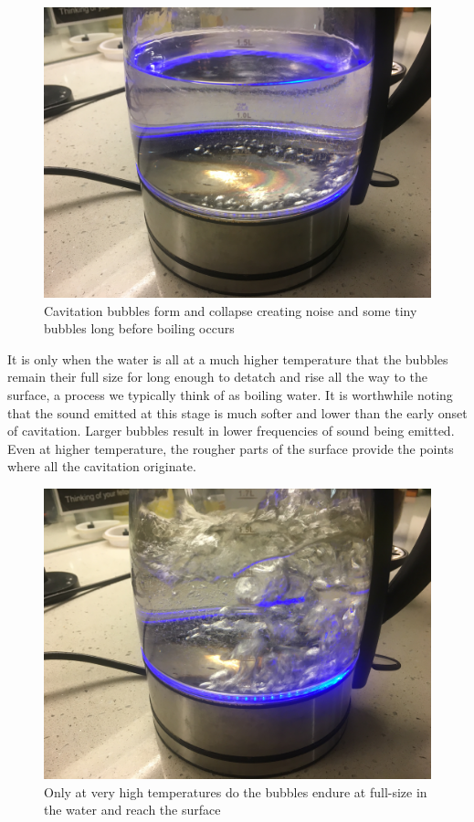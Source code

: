 \documentclass{article}\usepackage[]{graphicx}\usepackage[]{color}
\begin{document}
\begin{figure}
\includegraphics[width=\textwidth]{EarlyCavitation.JPG}
\caption{Cavitation bubbles form and collapse creating noise and some tiny bubbles long before boiling occurs}
\label{fig:EarlyCavitation.JPG}
\end{figure}

It is only when the water is all at a much higher temperature that the bubbles remain their full size for long enough to detatch and rise all the way to the surface, a process we typically think of as boiling water.  It is worthwhile noting that the sound emitted at this stage is much softer and lower than the early onset of cavitation. Larger bubbles result in lower frequencies of sound being emitted. Even at higher temperature, the rougher parts of the surface provide the points where all the cavitation originate.

\begin{figure}
\includegraphics[width=\textwidth]{BoilingCavitation.JPG}
\caption{Only at very high temperatures do the bubbles endure at full-size in the water and reach the surface}
\label{fig:BoilingCavitation.JPG}
\end{figure}
\end{document}
